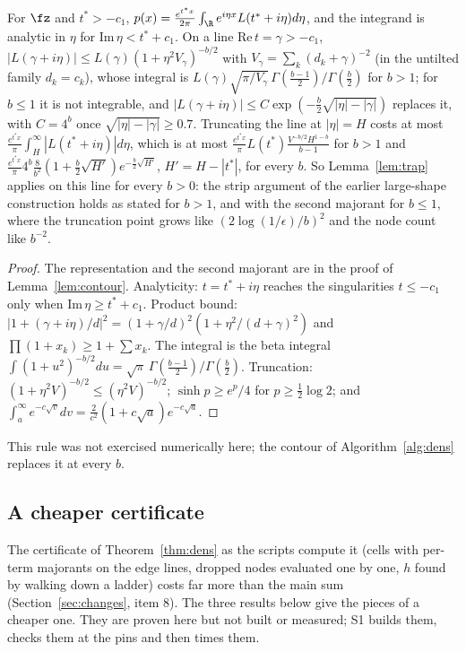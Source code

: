 \begin{proposition}\label{prop:tline}
For $\fz$ and $t^*>-c_1$, $p(x)=\frac{e^{t^*x}}{2\pi}\int_\R e^{i\eta x}L(t^*+i\eta)d\eta$, and the integrand is
analytic in $\eta$ for $\mathrm{Im}\,\eta<t^*+c_1$. On a line $\mathrm{Re}\,t=\gamma>-c_1$,
$|L(\gamma+i\eta)|\le L(\gamma)(1+\eta^2V_\gamma)^{-b/2}$ with $V_\gamma=\sum_k(d_k+\gamma)^{-2}$ (in the untilted
family $d_k=c_k$), whose integral is $L(\gamma)\sqrt{\pi/V_\gamma}\,\Gamma(\frac{b-1}2)/\Gamma(\frac b2)$ for
$b>1$; for $b\le1$ it is not integrable, and $|L(\gamma+i\eta)|\le C\exp(-\frac b2\sqrt{|\eta|-|\gamma|})$ replaces
it, with $C=4^b$ once $\sqrt{|\eta|-|\gamma|}\ge0.7$. Truncating the line at $|\eta|=H$ costs at most
$\frac{e^{t^*x}}{\pi}\int_H^\infty|L(t^*+i\eta)|d\eta$, which is at most
$\frac{e^{t^*x}}{\pi}L(t^*)\frac{V^{-b/2}H^{1-b}}{b-1}$ for $b>1$ and
$\frac{e^{t^*x}}{\pi}4^b\frac8{b^2}(1+\frac b2\sqrt{H'})e^{-\frac b2\sqrt{H'}}$, $H'=H-|t^*|$, for every $b$.
So Lemma~\ref{lem:trap} applies on this line for every $b>0$: the strip argument of the earlier large-shape
construction holds as stated for $b>1$, and with the second majorant for $b\le1$, where the truncation point grows
like $(2\log(1/\epsilon)/b)^2$ and the node count like $b^{-2}$.
\end{proposition}
\begin{proof}
The representation and the second majorant are in the proof of Lemma~\ref{lem:contour}. Analyticity: $t=t^*+i\eta$
reaches the singularities $t\le-c_1$ only when $\mathrm{Im}\,\eta\ge t^*+c_1$. Product bound:
$|1+(\gamma+i\eta)/d|^2=(1+\gamma/d)^2(1+\eta^2/(d+\gamma)^2)$ and $\prod(1+x_k)\ge1+\sum x_k$. The integral is
the beta integral $\int(1+u^2)^{-b/2}du=\sqrt\pi\,\Gamma(\frac{b-1}2)/\Gamma(\frac b2)$. Truncation:
$(1+\eta^2V)^{-b/2}\le(\eta^2V)^{-b/2}$; $\sinh p\ge e^p/4$ for $p\ge\frac12\log2$; and $\int_a^\infty
e^{-c\sqrt v}dv=\frac2{c^2}(1+c\sqrt a)e^{-c\sqrt a}$.
\end{proof}
This rule was not exercised numerically here; the contour of Algorithm~\ref{alg:dens} replaces it at every $b$.

\subsection{A cheaper certificate}\label{sec:cheap}

The certificate of Theorem~\ref{thm:dens} as the scripts compute it (cells with per-term majorants on the edge
lines, dropped nodes evaluated one by one, $h$ found by walking down a ladder) costs far more than the main sum
(Section~\ref{sec:changes}, item 8). The three results below give the pieces of a cheaper one. They are proven
here but not built or measured; S1 builds them, checks them at the pins and then times them.

